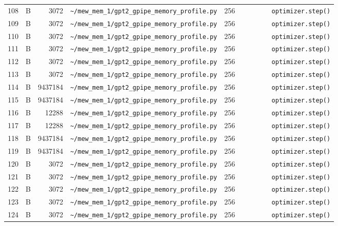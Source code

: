 \documentclass{article}
\begin{document}
\begin{longtable}{r l r p{6.5cm} r p{7.0cm}}
108 & B & 3072 & \lstinline|~/mew_mem_1/gpt2_gpipe_memory_profile.py| & 256 & \lstinline|        optimizer.step()| \\
109 & B & 3072 & \lstinline|~/mew_mem_1/gpt2_gpipe_memory_profile.py| & 256 & \lstinline|        optimizer.step()| \\
110 & B & 3072 & \lstinline|~/mew_mem_1/gpt2_gpipe_memory_profile.py| & 256 & \lstinline|        optimizer.step()| \\
111 & B & 3072 & \lstinline|~/mew_mem_1/gpt2_gpipe_memory_profile.py| & 256 & \lstinline|        optimizer.step()| \\
112 & B & 3072 & \lstinline|~/mew_mem_1/gpt2_gpipe_memory_profile.py| & 256 & \lstinline|        optimizer.step()| \\
113 & B & 3072 & \lstinline|~/mew_mem_1/gpt2_gpipe_memory_profile.py| & 256 & \lstinline|        optimizer.step()| \\
114 & B & 9437184 & \lstinline|~/mew_mem_1/gpt2_gpipe_memory_profile.py| & 256 & \lstinline|        optimizer.step()| \\
115 & B & 9437184 & \lstinline|~/mew_mem_1/gpt2_gpipe_memory_profile.py| & 256 & \lstinline|        optimizer.step()| \\
116 & B & 12288 & \lstinline|~/mew_mem_1/gpt2_gpipe_memory_profile.py| & 256 & \lstinline|        optimizer.step()| \\
117 & B & 12288 & \lstinline|~/mew_mem_1/gpt2_gpipe_memory_profile.py| & 256 & \lstinline|        optimizer.step()| \\
118 & B & 9437184 & \lstinline|~/mew_mem_1/gpt2_gpipe_memory_profile.py| & 256 & \lstinline|        optimizer.step()| \\
119 & B & 9437184 & \lstinline|~/mew_mem_1/gpt2_gpipe_memory_profile.py| & 256 & \lstinline|        optimizer.step()| \\
120 & B & 3072 & \lstinline|~/mew_mem_1/gpt2_gpipe_memory_profile.py| & 256 & \lstinline|        optimizer.step()| \\
121 & B & 3072 & \lstinline|~/mew_mem_1/gpt2_gpipe_memory_profile.py| & 256 & \lstinline|        optimizer.step()| \\
122 & B & 3072 & \lstinline|~/mew_mem_1/gpt2_gpipe_memory_profile.py| & 256 & \lstinline|        optimizer.step()| \\
123 & B & 3072 & \lstinline|~/mew_mem_1/gpt2_gpipe_memory_profile.py| & 256 & \lstinline|        optimizer.step()| \\
124 & B & 3072 & \lstinline|~/mew_mem_1/gpt2_gpipe_memory_profile.py| & 256 & \lstinline|        optimizer.step()| \\

\end{longtable}
\end{document}
